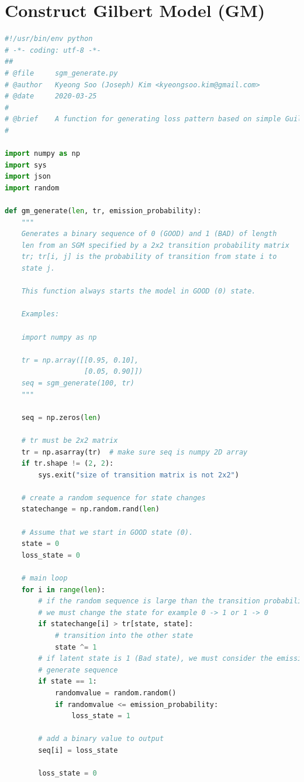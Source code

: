 \documentclass[11pt]{article}
\begin{document}
\section{Construct Gilbert Model (GM)}\label{CGM}
\begin{lstlisting}[language=Python]
#!/usr/bin/env python
# -*- coding: utf-8 -*-
##
# @file     sgm_generate.py
# @author   Kyeong Soo (Joseph) Kim <kyeongsoo.kim@gmail.com>
# @date     2020-03-25
#
# @brief    A function for generating loss pattern based on simple Guilbert model.
#

import numpy as np
import sys
import json
import random

def gm_generate(len, tr, emission_probability):
    """
    Generates a binary sequence of 0 (GOOD) and 1 (BAD) of length
    len from an SGM specified by a 2x2 transition probability matrix
    tr; tr[i, j] is the probability of transition from state i to
    state j.

    This function always starts the model in GOOD (0) state.

    Examples:

    import numpy as np

    tr = np.array([[0.95, 0.10],
                   [0.05, 0.90]])
    seq = sgm_generate(100, tr)
    """

    seq = np.zeros(len)

    # tr must be 2x2 matrix
    tr = np.asarray(tr)  # make sure seq is numpy 2D array
    if tr.shape != (2, 2):
        sys.exit("size of transition matrix is not 2x2")

    # create a random sequence for state changes
    statechange = np.random.rand(len)

    # Assume that we start in GOOD state (0).
    state = 0
    loss_state = 0

    # main loop
    for i in range(len):
        # if the random sequence is large than the transition probability
        # we must change the state for example 0 -> 1 or 1 -> 0
        if statechange[i] > tr[state, state]:
            # transition into the other state
            state ^= 1
        # if latent state is 1 (Bad state), we must consider the emission probability to
        # generate sequence
        if state == 1:
            randomvalue = random.random()
            if randomvalue <= emission_probability:
                loss_state = 1

        # add a binary value to output
        seq[i] = loss_state

        loss_state = 0


\end{lstlisting}
\end{document}

